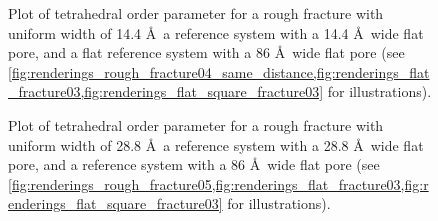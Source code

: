 %
\begin{figure}[!p]%
    \centering%
    {
        \captionsetup{width=\textwidth} 
        \caption{%
            Plot of tetrahedral order parameter for a rough fracture with uniform width of 14.4 \AA\, a reference system with a 14.4 \AA\ wide flat pore, and a flat reference system with a 86 \AA\ wide flat pore (see \cref{fig:renderings_rough_fracture04_same_distance,fig:renderings_flat_fracture03,fig:renderings_flat_square_fracture03} for illustrations).%
        }%
    }
\end{figure}%
%
\begin{figure}[!p]%
    \centering%
    {
        \captionsetup{width=\textwidth} 
        \caption{%
            Plot of tetrahedral order parameter for a rough fracture with uniform width of 28.8 \AA\, a reference system with a 28.8 \AA\ wide flat pore, and a reference system with a 86 \AA\ wide flat pore (see \cref{fig:renderings_rough_fracture05,fig:renderings_flat_fracture03,fig:renderings_flat_square_fracture03} for illustrations).%
        }%
    }
\end{figure}%